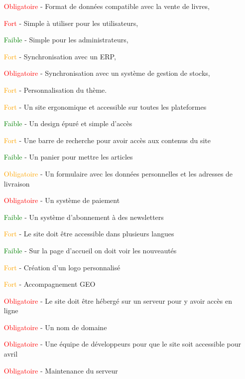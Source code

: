 \documentclass[a4paper,12pt]{report}
\begin{document}
\begin{itemize}
\item[\textcolor{red}{Obligatoire} -] Format de données compatible avec la vente
  de livres,
\item[\textcolor{red}{Fort} -] Simple à utiliser pour les utilisateurs,
\item[\textcolor{green}{Faible} -] Simple pour les administrateurs,
\item[\textcolor{orange}{Fort} -] Synchronisation avec un ERP,
\item[\textcolor{red}{Obligatoire} -] Synchronisation avec un système de
  gestion de stocks,
\item[\textcolor{orange}{Fort} - ] Personnalisation du thème.
\item[\textcolor{orange}{Fort} - ] Un site ergonomique et accessible sur toutes les plateformes
\item[\textcolor{green}{Faible} - ] Un design épuré et simple d'accès
\item[\textcolor{orange}{Fort} - ] Une barre de recherche pour avoir accès aux contenus du site
\item[\textcolor{green}{Faible} - ] Un panier pour mettre les articles
\item[\textcolor{orange}{Obligatoire} - ] Un formulaire avec les
  données personnelles et les adresses de livraison
\item[\textcolor{red}{Obligatoire} - ] Un système de paiement
\item[\textcolor{green}{Faible} - ] Un système d'abonnement à des newsletters
\item[\textcolor{orange}{Fort} - ] Le site doit être accessible dans plusieurs langues
\item[\textcolor{green}{Faible} - ] Sur la page d'accueil on doit voir les nouveautés
\item[\textcolor{orange}{Fort} - ] Création d'un logo personnalisé
\item[\textcolor{orange}{Fort} - ] Accompagnement GEO
\item[\textcolor{red}{Obligatoire} - ] Le site doit être hébergé sur un serveur pour y avoir accès en ligne
\item[\textcolor{red}{Obligatoire} - ] Un nom de domaine
\item[\textcolor{red}{Obligatoire} - ] Une équipe de développeurs pour que le site soit accessible pour avril
\item[\textcolor{red}{Obligatoire} - ] Maintenance du serveur
\end{itemize}
\end{document}
